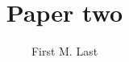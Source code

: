 \documentclass[11pt, titlepage]{article}
\title{Paper two}
\author{First M. Last}
\date{2017
  \vfill
  \singlespacing
  \begin{center}
    Manuscript currently under review.
  \end{center}
\vfill}
\begin{document}
\maketitle

\begin{abstract}
 \lipsum[1]
\end{abstract}

\clearpage

\lipsum[2-50]

\end{document}
